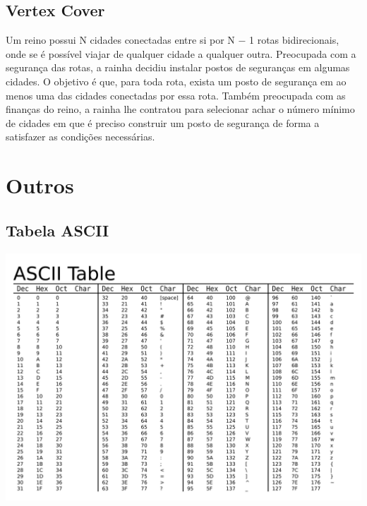 \documentclass[a4paper,12pt]{article}
\begin{document}

\subsection{Vertex Cover}
\indent Um reino possui N cidades conectadas entre si por N − 1 rotas bidirecionais, onde se é possível viajar de qualquer cidade a qualquer outra. Preocupada com a segurança das rotas, a rainha decidiu instalar postos de seguranças em algumas cidades. O objetivo é que, para toda rota, exista um posto de segurança em ao menos uma das cidades conectadas por essa rota. Também preocupada com as finanças do reino, a rainha lhe contratou para selecionar achar o número mínimo de cidades em que é preciso construir um posto de segurança de forma a satisfazer as condições necessárias.


\newpage

\section{Outros}

\subsection{Tabela ASCII}
\begin{center}
  \includegraphics[width=\linewidth]{figures/outros/Ascii_Table.png}
\end{center}
\end{document}
